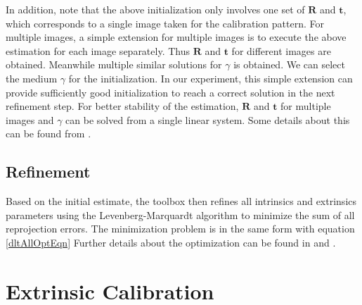 \documentclass{report}
\begin{document}
In addition, note that the above initialization only involves one set of $\mathbf{R}$ and $\mathbf{t}$, which corresponds to a single image taken for the calibration pattern. For multiple images, a simple extension for multiple images is to execute the above estimation for each image separately. Thus $\mathbf{R}$ and $\mathbf{t}$ for different images are obtained. Meanwhile multiple similar solutions for $\gamma$ is obtained. We can select the medium $\gamma$ for the initialization. In our experiment, this simple extension can provide sufficiently good initialization to reach a correct solution in the next refinement step. For better stability of the estimation, $\mathbf{R}$ and $\mathbf{t}$ for multiple images and $\gamma$ can be solved from a single linear system. Some details about this can be found from \cite{scaramuzza2006toolbox}. 

\section{Refinement}
Based on the initial estimate, the toolbox then refines all intrinsics and extrinsics parameters using the Levenberg-Marquardt algorithm to minimize the sum of all reprojection errors. The minimization problem is in the same form with equation \ref{dltAllOptEqn} Further details about the optimization can be found in \cite{mei2007single} and \cite{scaramuzza2006toolbox}.




\chapter{Extrinsic Calibration}
\end{document}
